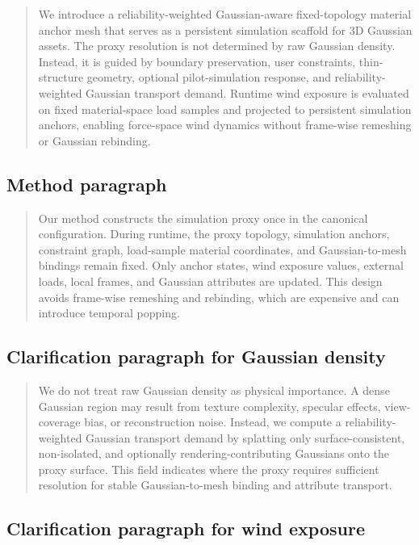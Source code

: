 \documentclass[11pt,a4paper]{article}
\begin{document}
\begin{quote}
We introduce a reliability-weighted Gaussian-aware fixed-topology material anchor mesh that serves as a persistent simulation scaffold for 3D Gaussian assets. The proxy resolution is not determined by raw Gaussian density. Instead, it is guided by boundary preservation, user constraints, thin-structure geometry, optional pilot-simulation response, and reliability-weighted Gaussian transport demand. Runtime wind exposure is evaluated on fixed material-space load samples and projected to persistent simulation anchors, enabling force-space wind dynamics without frame-wise remeshing or Gaussian rebinding.
\end{quote}

\subsection{Method paragraph}

\begin{quote}
Our method constructs the simulation proxy once in the canonical configuration. During runtime, the proxy topology, simulation anchors, constraint graph, load-sample material coordinates, and Gaussian-to-mesh bindings remain fixed. Only anchor states, wind exposure values, external loads, local frames, and Gaussian attributes are updated. This design avoids frame-wise remeshing and rebinding, which are expensive and can introduce temporal popping.
\end{quote}

\subsection{Clarification paragraph for Gaussian density}

\begin{quote}
We do not treat raw Gaussian density as physical importance. A dense Gaussian region may result from texture complexity, specular effects, view-coverage bias, or reconstruction noise. Instead, we compute a reliability-weighted Gaussian transport demand by splatting only surface-consistent, non-isolated, and optionally rendering-contributing Gaussians onto the proxy surface. This field indicates where the proxy requires sufficient resolution for stable Gaussian-to-mesh binding and attribute transport.
\end{quote}

\subsection{Clarification paragraph for wind exposure}
\end{document}
